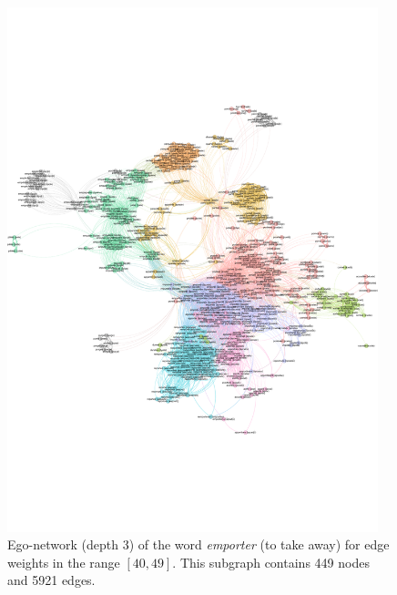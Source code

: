 \begin{figure}[t]
    \centering
    \includegraphics[width=0.96\textwidth, trim=0cm 5.5cm 0cm 5.5cm, clip]{assets/emporter-ego.pdf}
    \caption{Ego-network (depth 3) of the word \textit{emporter} (to take away) for edge weights in the range $[40,49]$. This subgraph contains 449 nodes and 5921 edges.}
    \label{fig:emporter-ego}
\end{figure}

